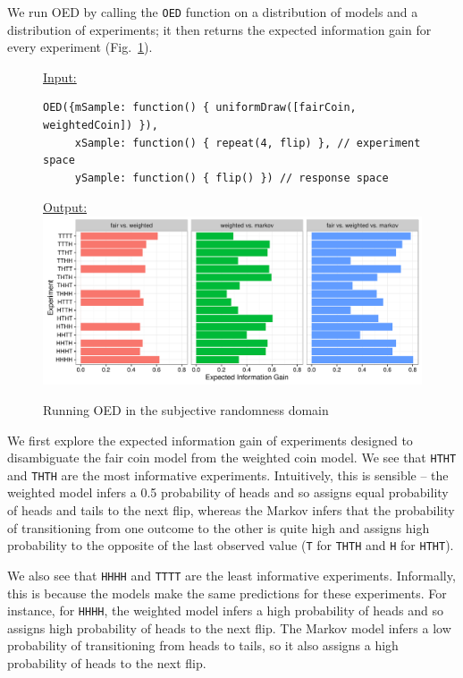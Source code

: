 \documentclass{article}
\newcommand{\lou}[1]{\textcolor{orange}{[lou: #1]}}
\begin{document}
We run OED by calling the \lstinline{OED} function on a distribution of models and a distribution of experiments; it then returns the expected information gain for every experiment (Fig.~\ref{fig:run-coin}).
%
\begin{figure}[h!]
\underline{\textsf{Input:}}
\begin{lstlisting}
OED({mSample: function() { uniformDraw([fairCoin, weightedCoin]) }),
     xSample: function() { repeat(4, flip) }, // experiment space
     ySample: function() { flip() }) // response space
\end{lstlisting}

\underline{\textsf{Output:}}\\
\includegraphics[width=\columnwidth]{img/coin_eig.pdf}
\caption{Running OED in the subjective randomness domain}
\label{fig:run-coin}
\end{figure}
%
We first explore the expected information gain of experiments designed to disambiguate the fair coin model from the weighted coin model.
We see that \lstinline{HTHT} and \lstinline{THTH} are the most informative experiments.
Intuitively, this is sensible -- the weighted model infers a 0.5 probability of heads and so assigns equal probability of heads and tails to the next flip, whereas the Markov infers that the probability of transitioning from one outcome to the other is quite high and assigns high probability to the opposite of the last observed value (\lstinline{T} for \lstinline{THTH} and \lstinline{H} for \lstinline{HTHT}).

We also see that \lstinline{HHHH} and \lstinline{TTTT} are the least informative experiments.
Informally, this is because the models make the same predictions for these experiments.
For instance, for \lstinline{HHHH}, the weighted model infers a high probability of heads and so assigns high probability of heads to the next flip.
The Markov model infers a low probability of transitioning from heads to tails, so it also assigns a high probability of heads to the next flip.
\end{document}
